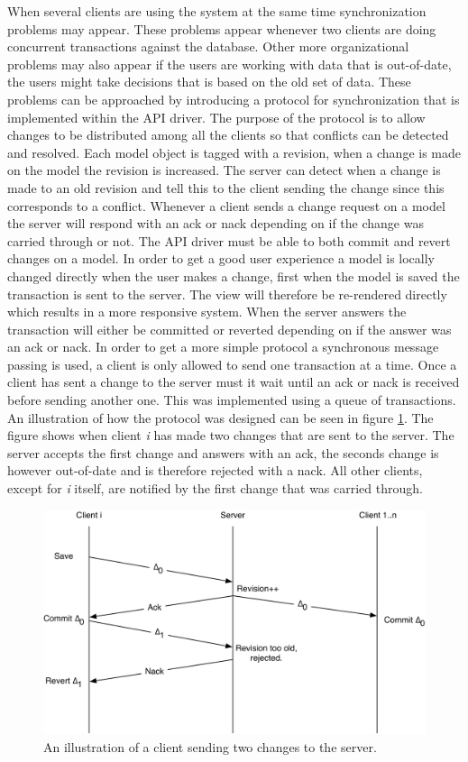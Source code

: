 When several clients are using the system at the same time synchronization problems may appear. These problems appear whenever two clients are doing concurrent transactions against the database. Other more organizational problems may also appear if the users are working with data that is out-of-date, the users might take decisions that is based on the old set of data. These problems can be approached by introducing a protocol for synchronization that is implemented within the API driver. The purpose of the protocol is to allow changes to be distributed among all the clients so that conflicts can be detected and resolved. Each model object is tagged with a revision, when a change is made on the model the revision is increased. The server can detect when a change is made to an old revision and tell this to the client sending the change since this corresponds to a conflict. Whenever a client sends a change request on a model the server will respond with an ack or nack depending on if the change was carried through or not. The API driver must be able to both commit and revert changes on a model. In order to get a good user experience a model is locally changed directly when the user makes a change, first when the model is saved the transaction is sent to the server. The view will therefore be re-rendered directly which results in a more responsive system. When the server answers the transaction will either be committed or reverted depending on if the answer was an ack or nack. In order to get a more simple protocol a synchronous message passing is used, a client is only allowed to send one transaction at a time. Once a client has sent a change to the server must it wait until an ack or nack is received before sending another one. This was implemented using a queue of transactions. An illustration of how the protocol was designed can be seen in figure \ref{fig:sync}. The figure shows when client {\em i} has made two changes that are sent to the server. The server accepts the first change and answers with an ack, the seconds change is however out-of-date and is therefore rejected with a nack. All other clients, except for {\em i} itself, are notified by the first change that was carried through.

\begin{figure}[h!]
	\centerline{\includegraphics[width=120mm]{gfx/sync.png}}
	\caption{An illustration of a client sending two changes to the server.}
	\label{fig:sync}
\end{figure}

